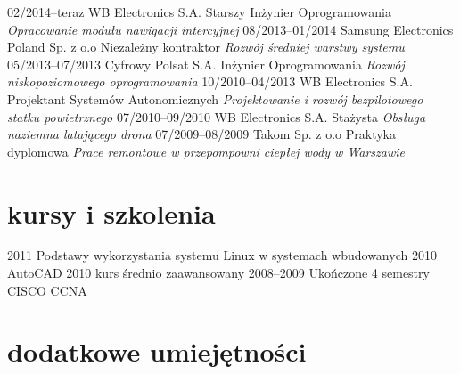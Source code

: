 \documentclass[]{friggeri-cv}
\begin{document}
\begin{entrylist}
  \entry
    {02/2014–teraz}
    {WB Electronics S.A.}
    {Starszy Inżynier Oprogramowania}
    {\emph{Opracowanie modułu nawigacji intercyjnej}}
  \entry
    {08/2013–01/2014}
    {Samsung Electronics Poland Sp. z o.o}
    {Niezależny kontraktor}
    {\emph{Rozwój średniej warstwy systemu}}
  \entry
    {05/2013–07/2013}
    {Cyfrowy Polsat S.A.}
    {Inżynier Oprogramowania}
    {\emph{Rozwój niskopoziomowego oprogramowania}}
  \entry
    {10/2010–04/2013}
    {WB Electronics S.A.}
    {Projektant Systemów Autonomicznych}
    {\emph{Projektowanie i rozwój bezpilotowego statku powietrznego}}
  \entry
    {07/2010–09/2010}
    {WB Electronics S.A.}
    {Stażysta}
    {\emph{Obsługa naziemna latającego drona}}
  \entry
    {07/2009–08/2009}
    {Takom Sp. z o.o}
    {Praktyka dyplomowa}
    {\emph{Prace remontowe w przepompowni ciepłej wody w Warszawie}}
\end{entrylist}

\section{kursy i szkolenia}

\begin{entrylist}
  \entry
    {2011}
    {Podstawy wykorzystania systemu Linux w systemach wbudowanych}
    {}
    {}
  \entry
    {2010}
    {AutoCAD 2010 kurs średnio zaawansowany}
    {}
    {}
  \entry
    {2008–2009}
    {Ukończone 4 semestry CISCO CCNA}
    {}
    {}
\end{entrylist}

\section{dodatkowe umiejętności}
\end{document}
